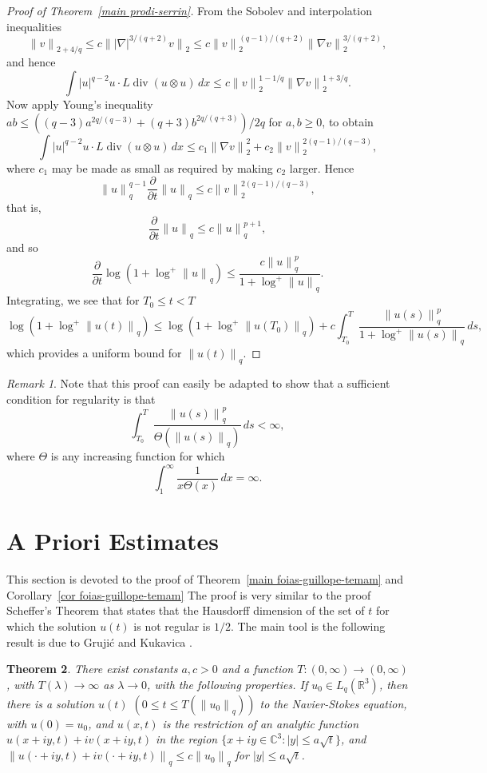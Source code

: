 \documentclass[12pt]{amsart}
\newtheorem{thm}{Theorem}[section]
\theoremstyle{remark}
\newtheorem{rem}[thm]{Remark}
\newcommand{\R}{{\mathbb R}}
\newcommand{\C}{{\mathbb C}}
\newcommand{\smodo}[1]{{\mathopen|#1\mathclose|}}
\newcommand{\snormo}[1]{{\mathopen\|#1\mathclose\|}}
\DeclareMathOperator{\divergence}{div}
\begin{document}
\begin{proof}[Proof of Theorem~\ref{main prodi-serrin}]
From the Sobolev and interpolation inequalities
$$ \snormo v_{2+4/q} \le c \snormo{ \smodo{\nabla}^{3/(q+2)} v}_2
   \le c \snormo v_2^{(q-1)/(q+2)} \snormo{\nabla v}_2^{3/(q+2)} ,$$
and hence
$$ \int \smodo u^{q-2} u \cdot L \divergence (u \otimes u) \, dx
   \le c
   \snormo v_2^{1-1/q} \snormo{\nabla v}_2^{1+3/q} .$$
Now apply Young's inequality $ab \le ((q-3)a^{2q/(q-3)} + (q+3)b^{2q/(q+3)})/2q$
for $a,b \ge 0$, to obtain
$$
   \int \smodo u^{q-2} u \cdot L \divergence (u \otimes u) \, dx
   \le 
   c_1 \snormo{\nabla v}_2^2 + c_2 \snormo v_2^{2(q-1)/(q-3)} ,
$$
where $c_1$ may be made as small as required by making $c_2$ larger.  
Hence
$$ \snormo u_q^{q-1} \frac\partial{\partial t}\snormo u_q
   \le c \snormo v_2^{2(q-1)/(q-3)},$$
that is,
$$ \frac\partial{\partial t}\snormo u_q
   \le c \snormo u_q^{p+1} ,$$
and so
$$ \frac\partial{\partial t}
   \log(1+\log^+\snormo u_q)
   \le 
   \frac{c \snormo u_q^p}{1+\log^+\snormo u_q} .$$
Integrating, we see that for $T_0 \le t < T$
$$ \log(1+\log^+\snormo{u(t)}_q) \le
   \log(1+\log^+\snormo{u(T_0)}_q) + 
   c \int_{T_0}^T \frac{\snormo{u(s)}_q^p}{1+\log^+\snormo{u(s)}_q} \, ds ,$$
which provides a uniform bound for $\snormo{u(t)}_q$.
\end{proof}

\begin{rem}
Note that this proof can easily be adapted to show that a sufficient condition
for regularity is that
$$
   \int_{T_0}^T \frac{\snormo{u(s)}_q^p}{\Theta(\snormo{u(s)}_q)} 
   \, ds < \infty ,$$
where $\Theta$ is any increasing function for which 
$$ \int_1^\infty \frac1{x\Theta(x)} \, dx = \infty .$$
\end{rem}

\section{A Priori Estimates}

This section is devoted to the proof of Theorem~\ref{main foias-guillope-temam}
and Corollary~\ref{cor foias-guillope-temam}
The proof is very similar to the proof Scheffer's Theorem \cite{scheffer} 
that states that the Hausdorff dimension
of the set of $t$ for which the solution $u(t)$ is not regular is
$1/2$.
The main tool is
the following result is due to 
Gruji\'c and Kukavica \cite{grujic-kukavica}.

\begin{thm} \label{space analytic}
There exist constants $a,c>0$ and a function
$T:(0,\infty) \to (0,\infty)$, with $T(\lambda) \to \infty$ as $\lambda\to 0$,
with the following properties.  If $u_0 \in L_q(\R^3)$, then there is
a solution $u(t)$ $(0 \le t \le T(\snormo{u_0}_q))$
to the Navier-Stokes equation, with $u(0) = u_0$, and
$u(x,t)$ is the restriction of an analytic function 
$u(x+iy,t) + iv(x+iy,t)$ in the region
$\{x+iy \in \C^3 : \smodo y \le a \sqrt t\}$, and
$\snormo{u(\cdot+iy,t) + i v(\cdot+iy,t)}_q \le c \snormo{u_0}_q$ for
$\smodo y \le a \sqrt t$.
\end{thm}
\end{document}
